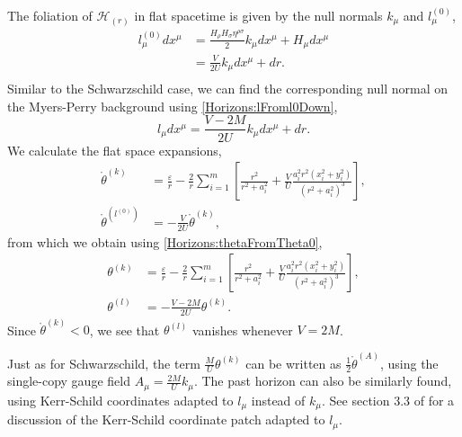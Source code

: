 The foliation of $\mathcal{H}_{(r)}$ in flat spacetime is given by the null normals $k_{\mu}$ and $l^{(0)}_{\mu}$,
\begin{equation}  
    \begin{split}
        l^{(0)}_{\mu} dx^{\mu} &= \frac{H_{\rho} H_{\sigma} \eta^{\rho \sigma}}{2} k_{\mu} dx^{\mu} + H_{\mu}
        dx^{\mu} \\
        &= \frac{V}{2U} k_{\mu} dx^{\mu} + dr. \\
    \end{split}
\end{equation}
Similar to the Schwarzschild case, we can find the corresponding null normal on the Myers-Perry background using
\eqref{Horizons:lFroml0Down},
\begin{equation}  
    l_{\mu} dx^{\mu} = \frac{V - 2M}{2U} k_{\mu} dx^{\mu} + dr.
\end{equation}
We calculate the flat space expansions,
\begin{equation}  
    \begin{split}
        \mathring{\theta}^{(k)} &= \frac{\varepsilon}{r} - \frac{2}{r} \sum_{i = 1}^{m} \left[
        \frac{r^{2}}{r^{2} + a_{i}^{2}} + \frac{V}{U} \frac{a_{i}^{2} r^{2} \left(x_{i}^{2} +
    y_{i}^{2}\right)}{\left(r^{2} + a_{i}^{2}\right)^{3}}\right], \\
            \mathring{\theta}^{(l^{(0)})} &= - \frac{V}{2U} \mathring{\theta}^{(k)},
    \end{split}
\end{equation}
from which we obtain using \eqref{Horizons:thetaFromTheta0},
\begin{equation}  
    \begin{split}
        \theta^{(k)} &= \frac{\varepsilon}{r} - \frac{2}{r} \sum_{i = 1}^{m} \left[
        \frac{r^{2}}{r^{2} + a_{i}^{2}} + \frac{V}{U} \frac{a_{i}^{2} r^{2} \left(x_{i}^{2} +
    y_{i}^{2}\right)}{\left(r^{2} + a_{i}^{2}\right)^{3}}\right], \\
            \theta^{(l)} &= -\frac{V - 2M}{2U} \theta^{(k)}.
    \end{split}
\end{equation}
Since $\mathring{\theta}^{(k)} < 0$, we see that $\theta^{(l)}$ vanishes whenever $V = 2M$.

Just as for Schwarzschild, the term $\frac{M}{U} \theta^{(k)}$ can be written as $\frac{1}{2}
\mathring{\theta}^{(A)}$, using the single-copy gauge field $A_{\mu} = \frac{2M}{U} k_{\mu}$. The past horizon can
also be similarly found, using Kerr-Schild coordinates adapted to $l_{\mu}$ instead of $k_{\mu}$.
See section 3.3 of \cite{Myers:1986un} for a discussion of the Kerr-Schild coordinate patch adapted to $l_{\mu}$.

